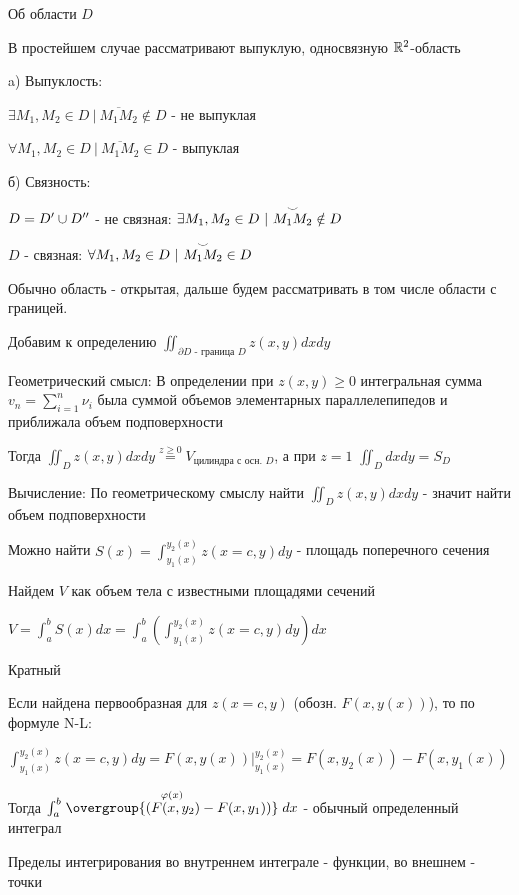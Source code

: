 \documentclass[12pt]{article}
\begin{document}
    \Nota Об области $D$

    В простейшем случае рассматривают выпуклую, односвязную $\mathbb{R}^2$-область

    a) Выпуклость:

    $\exists M_1, M_2 \in D \ | \ \overline{M_1 M_2} \notin D$ - не выпуклая

    $\forall M_1, M_2 \in D \ | \ \overline{M_1 M_2} \in D$ - выпуклая

    б) Связность:

    $D = D^\prime \cup D^{\prime\prime}$ - не связная: $\exists M_1, M_2 \in D \ | \ \overset{\LARGE\smile}{M_1 M_2} \notin D$

    $D$ - связная: $\forall M_1, M_2 \in D \ | \ \overset{\LARGE\smile}{M_1 M_2} \in D$

    Обычно область - открытая, дальше будем рассматривать в том числе области с границей.

    Добавим к определению $\iint_{\partial D \text{ - граница } D} z(x, y) dx dy$

    Геометрический смысл: В определении при $z(x, y) \geq 0$ интегральная сумма $v_n = \sum_{i=1}^n \nu_i$ была суммой объемов элементарных параллелепипедов и приближала объем подповерхности

    Тогда $\iint_D z(x, y) dx dy \stackrel{z \geq 0}{=} V_{\text{цилиндра с осн. } D}$, а при $z = 1$ $\iint_D dx dy = S_D$

    Вычисление: По геометрическому смыслу найти $\iint_D z(x, y) dx dy$ - значит найти объем подповерхности

    Можно найти $S(x) = \int^{y_2(x)}_{y_1(x)} z(x = c, y) dy$ - площадь поперечного сечения

    Найдем $V$ как объем тела с известными площадями сечений

    $V = \int^b_a S(x) dx = \int_a^b \left(\int^{y_2(x)}_{y_1(x)} z(x = c, y) dy\right) dx$

    \Nota Кратный

    Если найдена первообразная для $z(x = c, y)$ (обозн. $F(x, y(x))$), то по формуле N-L:

    $\int^{y_2(x)}_{y_1(x)} z(x = c, y) dy = F(x, y(x)) \Big|^{y_2(x)}_{y_1(x)} = F(x, y_2(x)) - F(x, y_1(x))$

    Тогда $\int^b_a \stackrel{\varphi(x)}{\overgroup{(F(x, y_2) - F(x, y_1))}} dx$ - обычный определенный интеграл

    Пределы интегрирования во внутреннем интеграле - функции, во внешнем - точки
\end{document}
